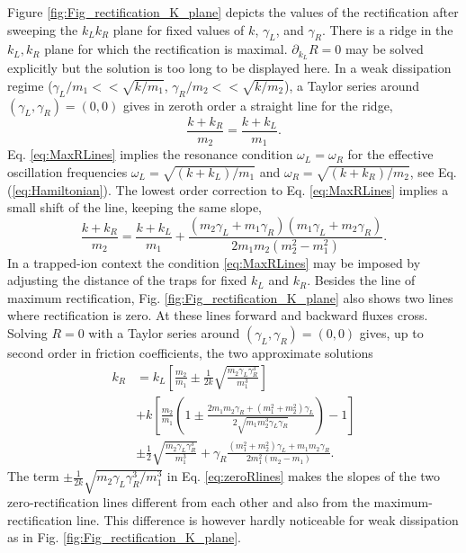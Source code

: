 Figure \ref{fig:Fig_rectification_K_plane} depicts the values of the rectification after sweeping the $k_L k_R$ plane for fixed values of $k$, $\gamma_L$, and $\gamma_R$. There is a ridge in the $k_L,k_R$ plane for which the rectification is maximal. $\partial_{k_L}R = 0$ may be
solved explicitly but the solution is too long to be displayed here. In a weak dissipation regime
(${\gamma_L}/{m_1}<<\sqrt{{k}/{m_1}}$, ${\gamma_R}/{m_2}<<\sqrt{{k}/{m_2}}$), a Taylor series around $(\gamma_L,\gamma_R) = (0,0)$ gives in zeroth order
a straight line for the ridge,
%
\begin{equation}
  \frac{k+k_R}{m_2} = \frac{k+k_L}{m_1}.
  \label{eq:MaxRLines}
\end{equation}
%
Eq. \eqref{eq:MaxRLines} implies the resonance condition $\omega_L = \omega_R$
for the effective oscillation frequencies $\omega_L = \sqrt{{(k+k_L)}/{m_1}}$ and $\omega_R = \sqrt{{(k+k_R)}/{m_2}}$,
see Eq. (\ref{eq:Hamiltonian}). The lowest order correction to  Eq. \eqref{eq:MaxRLines} implies a small shift of the line,
keeping the same slope,
%
\begin{equation}
  \frac{k+k_R}{m_2} = \frac{k+k_L}{m_1} + \frac{(m_2\gamma_L+m_1\gamma_R)(m_1\gamma_L+m_2\gamma_R)}{2m_1m_2(m_2^2-m_1^2)}.
  \label{eq:MaxRLines_correction}
\end{equation}
%
In a trapped-ion context the condition \eqref{eq:MaxRLines} may be imposed by adjusting the distance of the traps for fixed $k_L$ and $k_R$. Besides the line of maximum rectification, Fig. \ref{fig:Fig_rectification_K_plane} also shows two lines where rectification is zero.
At these lines forward and backward fluxes cross.
Solving $R=0$ with a Taylor series around $(\gamma_L,\gamma_R) = (0,0)$ gives, up to second order in friction coefficients,  the two approximate solutions
%
\begin{align}
k_R &= k_L\left[\frac{m_2}{m_1}\pm\frac{1}{2k}\sqrt{\frac{m_2\gamma_L\gamma_R^3}{m_1^3}}\right]
\nonumber\\
&+k\left[\frac{m_2}{m_1}\left(1\pm \frac{ 2 m_1 m_2 \gamma_R + (m_1^2 + m_2^2)\gamma_L }{2\sqrt{m_1 m_2^3 \gamma_L \gamma_R}} \right)-1\right]
\nonumber\\
&\pm\frac{1}{2}\sqrt{\frac{m_2\gamma_L\gamma_R^3}{m_1^3}} + \gamma_R\frac{(m_1^2+m_2^2)\gamma_L + m_1m_2\gamma_R}{2m_1^2(m_2-m_1)}.
\label{eq:zeroRlines}
\end{align}
%
The term $\pm\frac{1}{2k}\sqrt{{m_2\gamma_L\gamma_R^3}/{m_1^3}}$ in Eq. \eqref{eq:zeroRlines} makes the slopes of the
two zero-rectification lines different from each other and also from the maximum-rectification line. This difference is however
hardly noticeable for weak dissipation as in  Fig. \ref{fig:Fig_rectification_K_plane}.

